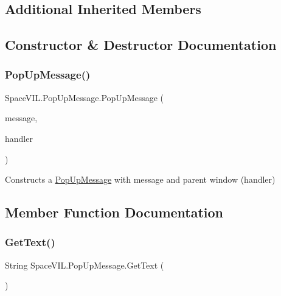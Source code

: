\subsection*{Additional Inherited Members}


\subsection{Constructor \& Destructor Documentation}
\mbox{\label{class_space_v_i_l_1_1_pop_up_message_ab0331b1354c101d640ed34ec060b3bcf}} 
\subsubsection{\texorpdfstring{Pop\+Up\+Message()}{PopUpMessage()}}
{\footnotesize\ttfamily Space\+V\+I\+L.\+Pop\+Up\+Message.\+Pop\+Up\+Message (\begin{DoxyParamCaption}\item[{String}]{message,  }\item[{\mbox{\hyperlink{class_space_v_i_l_1_1_window_layout}{Window\+Layout}}}]{handler }\end{DoxyParamCaption})\hspace{0.3cm}{\ttfamily [inline]}}



Constructs a \mbox{\hyperlink{class_space_v_i_l_1_1_pop_up_message}{Pop\+Up\+Message}} with message and parent window (handler) 



\subsection{Member Function Documentation}
\mbox{\label{class_space_v_i_l_1_1_pop_up_message_a88fb35dbe3c0ffb09d6ab49d4e179a21}} 
\subsubsection{\texorpdfstring{Get\+Text()}{GetText()}}
{\footnotesize\ttfamily String Space\+V\+I\+L.\+Pop\+Up\+Message.\+Get\+Text (\begin{DoxyParamCaption}{ }\end{DoxyParamCaption})\hspace{0.3cm}{\ttfamily [inline]}}



